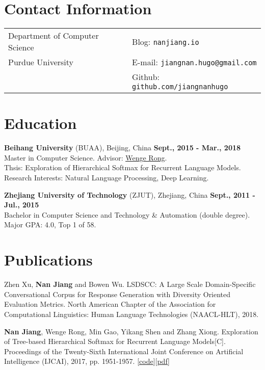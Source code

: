 \documentclass[margin,line]{resume}
\begin{document}

\begin{resume}
\section{Contact Information}
\begin{tabular}{@{}p{3.5in}p{3.5in}}
Department of Computer Science  & { Blog:} {\tt nanjiang.io} \\
Purdue University                 & { E-mail:}  {\tt jiangnan.hugo@gmail.com}  \\
                             & { Github:} {\tt github.com/jiangnanhugo} \\
\end{tabular}


\section{Education}
{\bf Beihang University} (BUAA), Beijing, China \hfill {\bf Sept., 2015 - Mar., 2018}\\
Master in Computer Science. Advisor: \underline{\href{http://dblp.uni-trier.de/pers/hd/r/Rong:Wenge}{Wenge Rong}}.\\
Thsis: Exploration of Hierarchical Softmax for Recurrent Language Models. \\
Research Interests: Natural Language Processing, Deep Learning.

{\bf Zhejiang University of Technology} (ZJUT), Zhejiang, China \hfill {\bf Sept., 2011 - Jul., 2015}\\
Bachelor in Computer Science and Technology \& Automation (double degree). \\
\space Major GPA: 4.0, Top 1 of 58.


\section{Publications}
Zhen Xu, \textbf{Nan Jiang} and Bowen Wu. LSDSCC: A Large Scale Domain-Specific Conversational Corpus for Response Generation with Diversity Oriented Evaluation Metrics. North American Chapter of the Association for Computational Linguistics: Human Language Technologies (NAACL-HLT), 2018.

\textbf{Nan Jiang}, Wenge Rong, Min Gao, Yikang Shen and Zhang Xiong. Exploration of Tree-based Hierarchical Softmax for Recurrent Language Models[C]. Proceedings of the Twenty-Sixth International Joint Conference on Artificial Intelligence (IJCAI), 2017, pp. 1951-1957. [\href{https://github.com/jiangnanHugo/lmkit}{code}][\href{https://www.ijcai.org/proceedings/2017/0271.pdf}{pdf}]



\end{resume}
\end{document}
